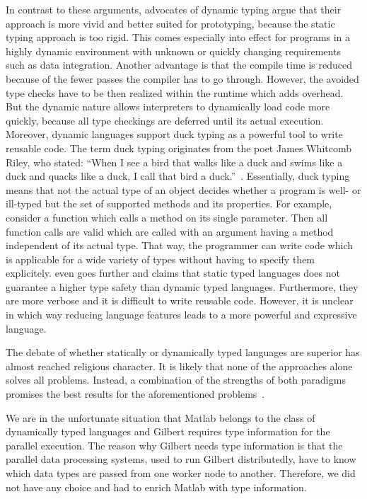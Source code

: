 In contrast to these arguments, advocates of dynamic typing argue that their approach is more vivid and better suited for prototyping, because the static typing approach is too rigid.
This comes especially into effect for programs in a highly dynamic environment with unknown or quickly changing requirements such as data integration.
Another advantage is that the compile time is reduced because of the fewer passes the compiler has to go through.
However, the avoided type checks have to be then realized within the runtime which adds overhead.
But the dynamic nature allows interpreters to dynamically load code more quickly, because all type checkings are deferred until its actual execution.
Moreover, dynamic languages support duck typing as a powerful tool to write reusable code.
The term duck typing originates from the poet James Whitcomb Riley, who stated: \enquote{When I see a bird that walks like a duck and swims like a duck and quacks like a duck, I call that bird a duck.}~\cite{heim:2007a}.
Essentially, duck typing means that not the actual type of an object decides whether a program is well- or ill-typed but the set of supported methods and its properties.
For example, consider a function which calls a method  on its single parameter.
Then all function calls are valid which are called with an argument having a method  independent of its actual type.
That way, the programmer can write code which is applicable for a wide variety of types without having to specify them explicitely.
\textcite{ousterhout:c1998a} even goes further and claims that static typed languages does not guarantee a higher type safety than dynamic typed languages.
Furthermore, they are more verbose and it is difficult to write reusable code.
However, it is unclear in which way reducing language features leads to a more powerful and expressive language. 

The debate of whether statically or dynamically typed languages are superior has almost reached religious character.
It is likely that none of the approaches alone solves all problems.
Instead, a combination of the strengths of both paradigms promises the best results for the aforementioned problems~\cite{meijer:2004a}.

We are in the unfortunate situation that Matlab belongs to the class of dynamically typed languages and Gilbert requires type information for the parallel execution.
The reason why Gilbert needs type information is that the parallel data processing systems, used to run Gilbert distributedly, have to know which data types are passed from one worker node to another.
Therefore, we did not have any choice and had to enrich Matlab with type information.

